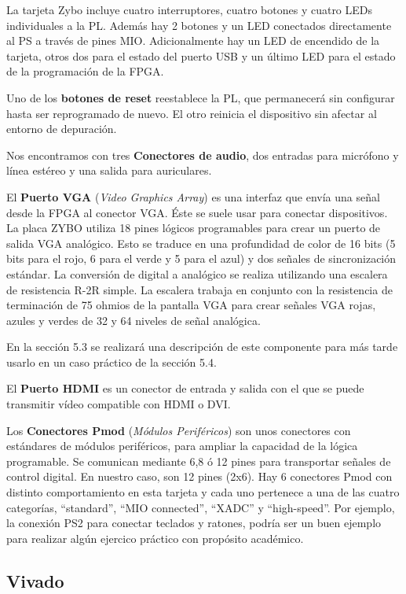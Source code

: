 La tarjeta Zybo incluye cuatro interruptores, cuatro botones y cuatro LEDs individuales a la PL. Además hay 2 botones y un LED conectados 
directamente al PS a través de pines MIO. Adicionalmente hay un LED de encendido de la tarjeta, otros dos para el estado del puerto USB 
y un último LED para el estado de la programación de la FPGA.

Uno de los \textbf{botones de reset} reestablece la PL, que permanecerá sin configurar hasta ser reprogramado de nuevo. El otro reinicia 
el dispositivo sin afectar al entorno de depuración. 

Nos encontramos con tres \textbf{Conectores de audio}, dos entradas para micrófono y línea estéreo y una salida para auriculares.

El \textbf{Puerto VGA} (\textit{Video Graphics Array}) es una interfaz que envía una señal desde la FPGA al conector VGA. Éste se suele usar 
para conectar dispositivos. La placa ZYBO utiliza 18 pines lógicos programables para crear un puerto de salida VGA analógico. Esto se traduce 
en una profundidad de color de 16 bits (5 bits para el rojo, 6 para el verde y 5 para el azul) y dos señales de sincronización estándar. La 
conversión de digital a analógico se realiza utilizando una  escalera de resistencia R-2R simple. La escalera trabaja en conjunto con la resistencia 
de terminación de 75 ohmios de la pantalla VGA para crear señales VGA rojas, azules y verdes de 32 y 64 niveles de señal analógica.

En la sección 5.3 se realizará una descripción de este componente para más tarde usarlo en un caso práctico de la sección 5.4.

El \textbf{Puerto HDMI} es un conector de entrada y salida con el que se puede transmitir vídeo compatible con HDMI o DVI. 

Los \textbf{Conectores Pmod} (\textit{Módulos Periféricos}) son unos conectores con estándares de módulos periféricos, para ampliar la capacidad de la 
lógica programable. Se comunican mediante 6,8 ó 12 pines para transportar señales de control digital. En nuestro caso, son 12 pines (2x6). 
Hay 6 conectores Pmod con distinto comportamiento en esta tarjeta y cada uno pertenece a una de las cuatro categorías, ``standard'', ``MIO connected'', 
``XADC'' y ``high-speed''. Por ejemplo, la conexión PS2 para conectar teclados y ratones, podría ser un buen ejemplo para realizar algún ejercico práctico 
con propósito académico.

\subsection{Vivado}

